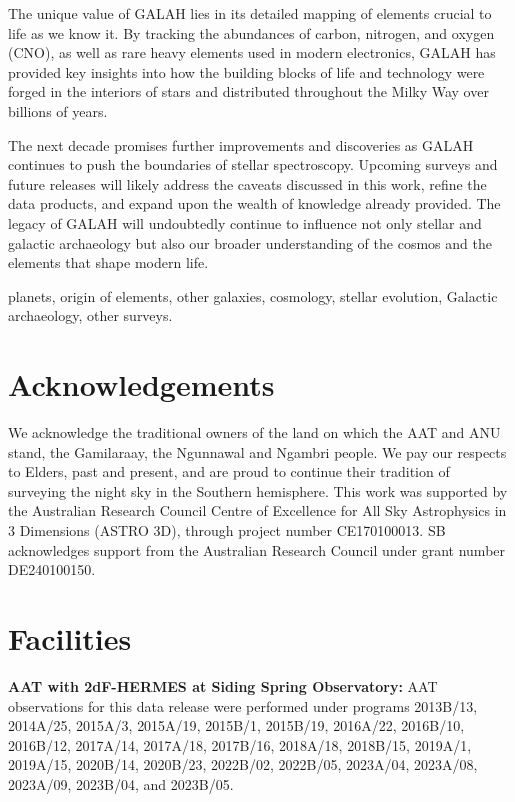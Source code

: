 \documentclass[
  journal=pasa,
  manuscript=research-paper, %
  year=2024,
  volume=37
]{cup-journal}
\begin{document}
The unique value of GALAH lies in its detailed mapping of elements crucial to life as we know it. By tracking the abundances of carbon, nitrogen, and oxygen (CNO), as well as rare heavy elements used in modern electronics, GALAH has provided key insights into how the building blocks of life and technology were forged in the interiors of stars and distributed throughout the Milky Way over billions of years.

The next decade promises further improvements and discoveries as GALAH continues to push the boundaries of stellar spectroscopy. Upcoming surveys and future releases will likely address the caveats discussed in this work, refine the data products, and expand upon the wealth of knowledge already provided. The legacy of GALAH will undoubtedly continue to influence not only stellar and galactic archaeology but also our broader understanding of the cosmos and the elements that shape modern life.

planets, origin of elements, other galaxies, cosmology, stellar evolution, Galactic archaeology, other surveys.


\section*{Acknowledgements}

We acknowledge the traditional owners of the land on which the AAT and ANU stand, the Gamilaraay, the Ngunnawal and Ngambri people. We pay our respects to Elders, past and present, and are proud to continue their tradition of surveying the night sky in the Southern hemisphere.
This work was supported by the Australian Research Council Centre of Excellence for All Sky Astrophysics in 3 Dimensions (ASTRO 3D), through project number CE170100013. SB acknowledges support from the Australian Research Council under grant number DE240100150.

\section*{Facilities}

\textbf{AAT with 2dF-HERMES at Siding Spring Observatory:}
AAT observations for this data release were performed under programs {2013B/13}, {2014A/25}, {2015A/3}, {2015A/19}, {2015B/1}, {2015B/19}, {2016A/22}, {2016B/10}, {2016B/12}, {2017A/14}, {2017A/18}, {2017B/16}, {2018A/18}, {2018B/15}, {2019A/1}, {2019A/15}, {2020B/14}, {2020B/23}, {2022B/02}, {2022B/05}, {2023A/04}, {2023A/08}, {2023A/09}, {2023B/04}, and {2023B/05}.
\end{document}
